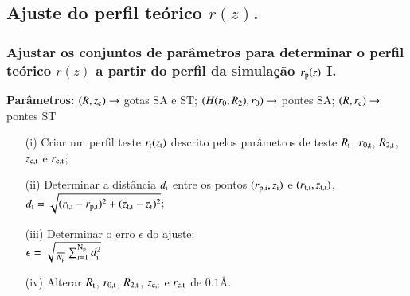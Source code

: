 \documentclass[8pt]{beamer}
\begin{document}
\subsection{Ajuste do perfil teórico $r(z)$.}
\begin{frame}
\frametitle{Ajustar os conjuntos de parâmetros  para determinar o perfil teórico $r(z)$ a partir do perfil da simulação $r_{\rm p}(z)$ I.}
	\vspace{-0.25cm}
	\begin{block}{	\small {\bf Parâmetros:} $(R,z_{\rm c})\rightarrow$ gotas SA e ST; $(H(r_{\rm 0},R_{\rm 2}),r_{\rm 0})\rightarrow$ pontes SA;  $(R,r_{\rm c})\rightarrow$ pontes ST}
		\begin{minipage}{0.45\textwidth}
		\end{minipage}	
		\begin{minipage}{0.54\textwidth}
				\begin{enumerate}
					\item[(i)]  \small  Criar um perfil teste $r_{\rm t}(z_{\rm t})$ descrito pelos parâmetros de teste $R_{\rm t}$, $r_{\rm 0, t}$, $R_{\rm 2,t}$, $z_{\rm c,t}$ e $r_{\rm c,t}$;
					\item[(ii)] \small  Determinar a distância $d_{\rm i}$ entre os pontos $(r{}_{\rm p,i}, z_{\rm i})$ e $(r_{\rm t,i},z_{\rm t,i})$, 
					$d_{\rm i} =\sqrt{(r_{\rm t,i} - r_{\rm p,i})^{\rm 2} +(z_{\rm t,i} - z_{\rm i})^{\rm 2}}$;
					\item[(iii)] \small Determinar o erro $\epsilon$ do ajuste:\\
						$\epsilon = \sqrt{\frac{1}{N_{\rm p}} \sum_{i=1}^{\rm N_{\rm p}} d_{\rm i}^{\rm 2}}$\\
					\item[(iv)] Alterar $R_{\rm t}$, $r_{\rm 0,t}$, $R_{\rm 2,t}$, $z_{\rm c,t}$ e $r_{\rm c,t}$ de $0.1$\AA. 
				\end{enumerate}
		\end{minipage}
	\end{block}
\end{frame}
\end{document}
